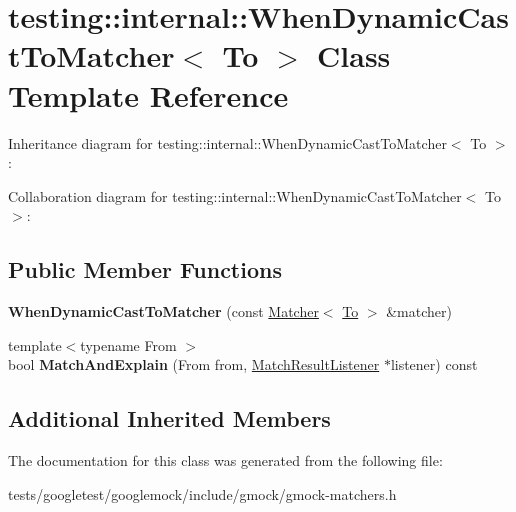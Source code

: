 \hypertarget{classtesting_1_1internal_1_1WhenDynamicCastToMatcher}{}\section{testing\+:\+:internal\+:\+:When\+Dynamic\+Cast\+To\+Matcher$<$ To $>$ Class Template Reference}
\label{classtesting_1_1internal_1_1WhenDynamicCastToMatcher}


Inheritance diagram for testing\+:\+:internal\+:\+:When\+Dynamic\+Cast\+To\+Matcher$<$ To $>$\+:


Collaboration diagram for testing\+:\+:internal\+:\+:When\+Dynamic\+Cast\+To\+Matcher$<$ To $>$\+:
\subsection*{Public Member Functions}
\begin{DoxyCompactItemize}
\item 
\mbox{\label{classtesting_1_1internal_1_1WhenDynamicCastToMatcher_a44e444d218197f8180c5ac7fca135f9a}} 
{\bfseries When\+Dynamic\+Cast\+To\+Matcher} (const \hyperlink{classtesting_1_1Matcher}{Matcher}$<$ \hyperlink{classtesting_1_1internal_1_1To}{To} $>$ \&matcher)
\item 
\mbox{\label{classtesting_1_1internal_1_1WhenDynamicCastToMatcher_a270f6a1e6ad7c9b69fdefca27c513bf5}} 
{\footnotesize template$<$typename From $>$ }\\bool {\bfseries Match\+And\+Explain} (From from, \hyperlink{classtesting_1_1MatchResultListener}{Match\+Result\+Listener} $\ast$listener) const
\end{DoxyCompactItemize}
\subsection*{Additional Inherited Members}


The documentation for this class was generated from the following file\+:\begin{DoxyCompactItemize}
\item 
tests/googletest/googlemock/include/gmock/gmock-\/matchers.\+h\end{DoxyCompactItemize}
